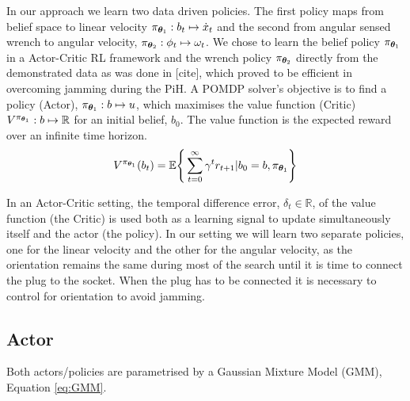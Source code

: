 In our approach we learn two data driven policies. The first policy maps from belief space 
to linear velocity $\pi_{\boldsymbol{\theta}_1} : b_t \mapsto \dot{x}_t$ and the second from 
angular sensed wrench to angular velocity, $ \pi_{\boldsymbol{\theta}_2} : \phi_t \mapsto \omega_t$.
We chose to learn the belief policy $\pi_{\boldsymbol{\theta}_1}$ in a Actor-Critic RL framework 
and the wrench policy $\pi_{\boldsymbol{\theta}_2}$ directly from the demonstrated data as was done 
in [cite], which proved to be efficient in overcoming jamming during the PiH. 
A POMDP solver's objective is to find a policy (Actor), $\pi_{\boldsymbol{\theta}_1}: b \mapsto u$, which maximises 
the value function (Critic) $V^{\pi_{\boldsymbol{\theta}_1}} : b \mapsto \mathbb{R}$ for an initial belief, $b_{0}$. The value function
is the expected reward over an infinite time horizon.
\begin{equation}\label{eq:value_function}
  V^{\pi_{\boldsymbol{\theta}_1}}(b_t) = \mathbb{E}\Bigg\{ \sum_{t=0}^{\infty} \gamma^{t} r_{t+1} | b_0=b,\pi_{\boldsymbol{\theta}_1}\Bigg\}
\end{equation}

In an Actor-Critic setting, the temporal difference error, $\delta_t \in \mathbb{R}$, of the value function (the Critic) is 
used both as a learning signal to update simultaneously itself and the actor (the policy). In our setting we will 
learn two separate policies, one for the linear velocity and the other for the angular velocity,
as the orientation remains the same during most of the search until it is time to connect the plug to the socket. 
When the plug has to be connected it is necessary to control for orientation to avoid jamming. 

\subsection{Actor}
Both actors/policies are parametrised by a Gaussian Mixture Model (GMM), Equation \ref{eq:GMM}.

